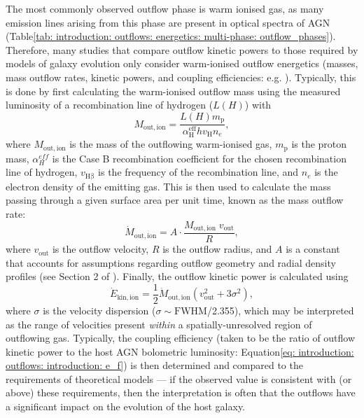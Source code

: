 The most commonly observed outflow phase is warm ionised gas, as many emission lines arising from this phase are present in optical spectra of AGN (Table\;\ref{tab: introduction: outflows: energetics: multi-phase: outflow_phases}). Therefore, many studies that compare outflow kinetic powers to those required by models of galaxy evolution only consider warm-ionised outflow energetics (masses, mass outflow rates, kinetic powers, and coupling efficiencies: e.g. \citealt{Liu2013, Rose2018, Tadhunter2019}). Typically, this is done by first calculating the warm-ionised outflow mass using the measured luminosity of a recombination line of hydrogen ($L(H)$) with
\begin{equation}
    M_\mathrm{out, ion} = \frac{L(H)m_\mathrm{p}}{\alpha^\mathrm{eff}_\mathrm{H}hv_\mathrm{H}n_e},
    \label{eq: introduction: outflows: energetics: mout}
\end{equation}
where $M_\mathrm{out, ion}$ is the mass of the outflowing warm-ionised gas, $m_\mathrm{p}$ is the proton mass, $\alpha^{eff}_{H}$ is the Case B recombination coefficient for the chosen recombination line of hydrogen, $v_\mathrm{H\beta}$ is the frequency of the recombination line, and $n_e$ is the electron density of the emitting gas. This is then used to calculate the mass passing through a given surface area per unit time, known as the mass outflow rate:
\begin{equation}
    \dot{M}_\mathrm{out, ion} = A\cdot\frac{M_\mathrm{out, ion}\;v_\mathrm{out}}{R},
    \label{eq: introduction: outflows: energetics: mout_rate}
\end{equation}
where $v_\mathrm{out}$ is the outflow velocity, $R$ is the outflow radius, and $A$ is a constant that accounts for assumptions regarding outflow geometry and radial density profiles (see Section 2 of \citealt{Veilleux2020}). Finally, the outflow kinetic power is calculated using
\begin{equation}
    \dot{E}_\mathrm{kin, ion} = \frac{1}{2}{\dot{M}_\mathrm{out, ion}(v^2_\mathrm{out} + 3\sigma^2)},
    \label{eq: introduction: outflows: energetics: ekin}
\end{equation}
where $\sigma$ is the velocity dispersion ($\sigma\sim\mathrm{FWHM}$/2.355), which may be interpreted as the range of velocities present \textit{within} a spatially-unresolved region of outflowing gas. Typically, the coupling efficiency (taken to be the ratio of outflow kinetic power to the host AGN bolometric luminosity: Equation\;\ref{eq: introduction: outflows: introduction: e_f}) is then determined and compared to the requirements of theoretical models --- if the observed value is consistent with (or above) these requirements, then the interpretation is often that the outflows have a significant impact on the evolution of the host galaxy.

